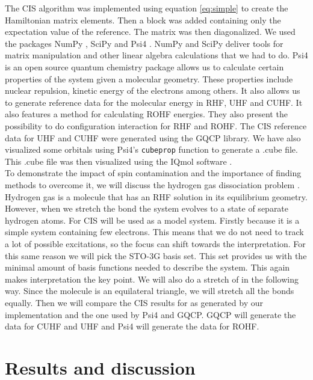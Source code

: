 The CIS algorithm was implemented using equation \eqref{eq:simple} to create the Hamiltonian matrix elements. Then a block was added containing only the expectation value of the
reference. The matrix was then diagonalized.
We used the packages NumPy \cite{Numpy}, SciPy \cite{Scipy} and Psi4 \cite{Psi4}. NumPy and SciPy deliver tools for matrix manipulation
and other linear algebra calculations that we had to do. Psi4 is an open source quantum chemistry package allows us to calculate certain properties of the system given a molecular
geometry. These properties include nuclear repulsion, kinetic energy of the electrons among others. It also allows us to generate reference data for the molecular energy in RHF, UHF
and CUHF. It also features a method for calculating ROHF energies. They also present the possibility to do configuration interaction for RHF and ROHF. The CIS reference data for
UHF and CUHF were generated using the GQCP \cite{GQCP} library. We have also visualized some orbitals using Psi4's \lstinline{cubeprop} function to generate a .cube file. This .cube
file was then visualized using the IQmol software \cite{IQmol}. \\
To demonstrate the impact of spin contamination and the importance of finding methods to overcome it, we will discuss the hydrogen gas dissociation problem \cite{Szabo1996}. Hydrogen
gas is a molecule that has an RHF solution in its equilibrium geometry. However, when we stretch the bond the system evolves to a state of separate hydrogen atoms. 
For CIS  will be used as a model system. Firstly because it is a simple system containing few electrons. This means that we do not need to track a lot of possible excitations,
so the focus can shift towards the interpretation. For this same reason we will pick the STO-3G basis set. This set provides us with the minimal amount of basis functions needed to
describe the system. This again makes interpretation the key point. We will also do a stretch of  in the following way. Since the molecule is an equilateral triangle, 
we will stretch all the bonds equally. Then we will compare the CIS results for  as generated by our implementation and the one used by Psi4 and GQCP.
GQCP will generate the data for CUHF and UHF and Psi4 will generate the data for ROHF.

\pagebreak
\section{Results and discussion}
\label{sec:results}

